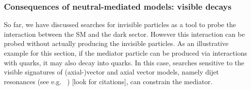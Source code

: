 \subsubsection{Consequences of neutral-mediated models: visible decays}
\label{sec:MediatorSearches}
\label{sub:twoBody}





So far, we have discussed searches for invisible particles as a tool to probe the interaction between the SM and the dark sector. 
However this interaction can be probed without actually producing the invisible particles. As an illustrative example for this section, if the mediator particle can be produced via interactions with quarks, it may also decay into quarks. 
In this case, searches sensitive to the visible signatures of (axial-)vector and axial vector models, namely dijet resonances (see e.g. ~\cite{Liew:2016oon,Fairbairn:2016iuf,Chala:2015ama}) [look for citations], can constrain the mediator.

